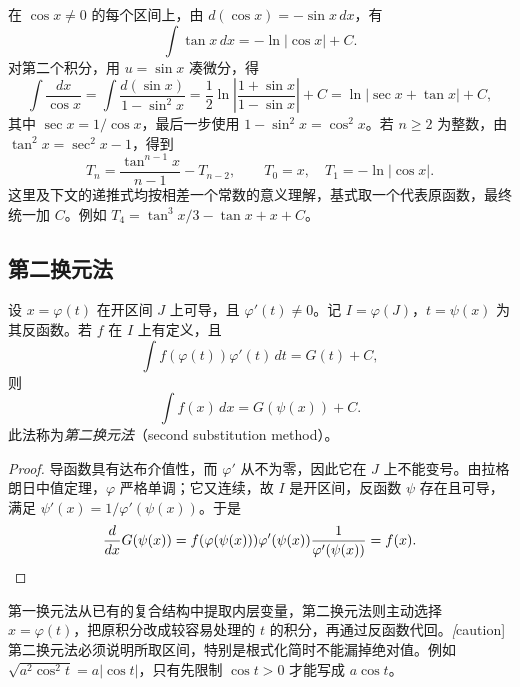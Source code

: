 \begin{solve}
在 $\cos x\neq0$ 的每个区间上，由 $d(\cos x)=-\sin x\,dx$，有
\[
    \int\tan x\,dx=-\ln|\cos x|+C.
\]
对第二个积分，用 $u=\sin x$ 凑微分，得
\[
    \int\frac{dx}{\cos x}
       =\int\frac{d(\sin x)}{1-\sin^2x}
       =\frac12\ln\left|\frac{1+\sin x}{1-\sin x}\right|+C
       =\ln|\sec x+\tan x|+C,
\]
其中 $\sec x=1/\cos x$，最后一步使用 $1-\sin^2x=\cos^2x$。若 $n\geq2$ 为整数，由 $\tan^2x=\sec^2x-1$，得到
\begin{equation}
    T_n=\frac{\tan^{n-1}x}{n-1}-T_{n-2},
    \qquad T_0=x,\quad T_1=-\ln|\cos x|.
    \label{eq:tangent-power-integral-recurrence}
\end{equation}
这里及下文的递推式均按相差一个常数的意义理解，基式取一个代表原函数，最终统一加 $C$。例如 $T_4=\tan^3x/3-\tan x+x+C$。
\end{solve}

\subsection{第二换元法}
\label{subsec:second-substitution-method}

\begin{theorem}[第二换元积分法]
\label{thm:second-substitution-indefinite-integral}
设 $x=\varphi(t)$ 在开区间 $J$ 上可导，且 $\varphi'(t)\neq0$。记 $I=\varphi(J)$，$t=\psi(x)$ 为其反函数。若 $f$ 在 $I$ 上有定义，且
\[
    \int f(\varphi(t))\varphi'(t)\,dt=G(t)+C,
\]
则
\begin{equation}
    \int f(x)\,dx=G(\psi(x))+C.
    \label{eq:second-substitution-indefinite-integral}
\end{equation}
此法称为\emph{第二换元法}（second substitution method）。
\end{theorem}

\begin{proof}
导函数具有达布介值性，而 $\varphi'$ 从不为零，因此它在 $J$ 上不能变号。由拉格朗日中值定理，$\varphi$ 严格单调；它又连续，故 $I$ 是开区间，反函数 $\psi$ 存在且可导，满足 $\psi'(x)=1/\varphi'(\psi(x))$。于是
\[
    \frac{d}{dx}G(\psi(x))
       =f(\varphi(\psi(x)))\varphi'(\psi(x))
          \frac1{\varphi'(\psi(x))}=f(x).
    \qedhere
\]
\end{proof}

第一换元法从已有的复合结构中提取内层变量，第二换元法则主动选择 $x=\varphi(t)$，把原积分改成较容易处理的 $t$ 的积分，再通过反函数代回。\emph[caution]{第二换元法必须说明所取区间，特别是根式化简时不能漏掉绝对值。}例如 $\sqrt{a^2\cos^2t}=a|\cos t|$，只有先限制 $\cos t>0$ 才能写成 $a\cos t$。


